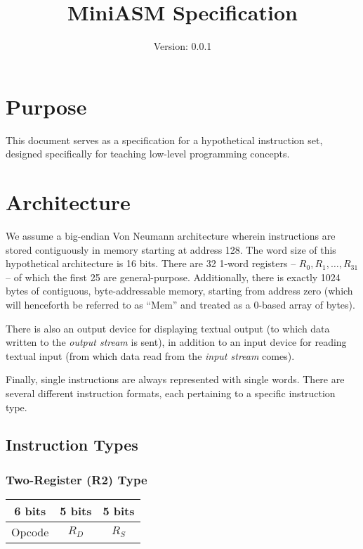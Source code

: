 \documentclass[12pt]{scrartcl}
\begin{document}
\title{MiniASM Specification}
\subtitle{Version: 0.0.1}
\date{}

\maketitle

\tableofcontents
\newpage

\section{Purpose}
This document serves as a specification for a hypothetical instruction set, designed specifically for teaching low-level programming concepts.


\section{Architecture}

We assume a big-endian Von Neumann architecture wherein instructions are stored contiguously in memory starting at address 128. The word size of this hypothetical architecture is 16 bits. There are 32 1-word registers -- $R_0, R_1, \ldots, R_{31}$ -- of which the first 25 are general-purpose. Additionally, there is exactly 1024 bytes of contiguous, byte-addressable memory, starting from address zero (which will henceforth be referred to as ``Mem'' and treated as a 0-based array of bytes). 

There is also an output device for displaying textual output (to which data written to the \textit{output stream} is sent), in addition to an input device for reading textual input (from which data read from the \textit{input stream} comes). 

Finally, single instructions are always represented with single words. There are several different instruction formats, each pertaining to a specific instruction type.


\subsection{Instruction Types}

\subsubsection{Two-Register (R2) Type}

\begin{center}
  \begin{tabular}{|c|c|c|}
    \hline
    \textbf{6 bits} & \textbf{5 bits} & \textbf{5 bits} \\
    \hline
    Opcode & $R_D$ & $R_S$ \\
    \hline
  \end{tabular}
\end{center}
\end{document}
